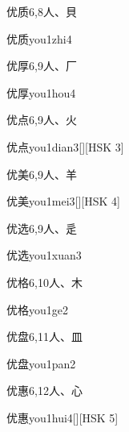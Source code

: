 \begin{entry}{优质}{6,8}{⼈、⾙}
  \begin{phonetics}{优质}{you1zhi4}
  \end{phonetics}
\end{entry}

\begin{entry}{优厚}{6,9}{⼈、⼚}
  \begin{phonetics}{优厚}{you1hou4}
  \end{phonetics}
\end{entry}

\begin{entry}{优点}{6,9}{⼈、⽕}
  \begin{phonetics}{优点}{you1dian3}[][HSK 3]
  \end{phonetics}
\end{entry}

\begin{entry}{优美}{6,9}{⼈、⽺}
  \begin{phonetics}{优美}{you1mei3}[][HSK 4]
  \end{phonetics}
\end{entry}

\begin{entry}{优选}{6,9}{⼈、⾡}
  \begin{phonetics}{优选}{you1xuan3}
  \end{phonetics}
\end{entry}

\begin{entry}{优格}{6,10}{⼈、⽊}
  \begin{phonetics}{优格}{you1ge2}
  \end{phonetics}
\end{entry}

\begin{entry}{优盘}{6,11}{⼈、⽫}
  \begin{phonetics}{优盘}{you1pan2}
  \end{phonetics}
\end{entry}

\begin{entry}{优惠}{6,12}{⼈、⼼}
  \begin{phonetics}{优惠}{you1hui4}[][HSK 5]
  \end{phonetics}
\end{entry}

